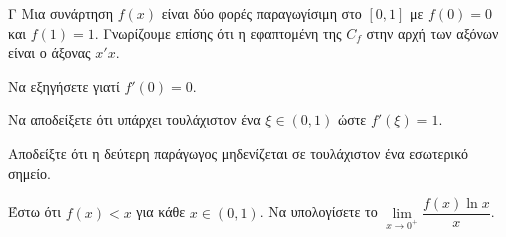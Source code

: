 \begin{thema}{Γ}
Μια συνάρτηση $f(x)$ είναι δύο φορές παραγωγίσιμη στο $[0, 1]$ με $f(0)=0$ και $f(1)=1$. Γνωρίζουμε επίσης ότι η εφαπτομένη της $C_f$ στην αρχή των αξόνων είναι ο άξονας $x'x$.
\begin{erwthma}
  \item Να εξηγήσετε γιατί $f'(0) = 0$.
  \item Να αποδείξετε ότι υπάρχει τουλάχιστον ένα $\xi \in (0, 1)$ ώστε $f'(\xi) = 1$.
  \item Αποδείξτε ότι η δεύτερη παράγωγος μηδενίζεται σε τουλάχιστον ένα εσωτερικό σημείο.
  \item Έστω ότι $f(x) < x$ για κάθε $x \in (0, 1)$. Να υπολογίσετε το $\lim\limits_{x \to 0^+} \dfrac{f(x) \ln x}{x}$.
\end{erwthma}
\end{thema}
